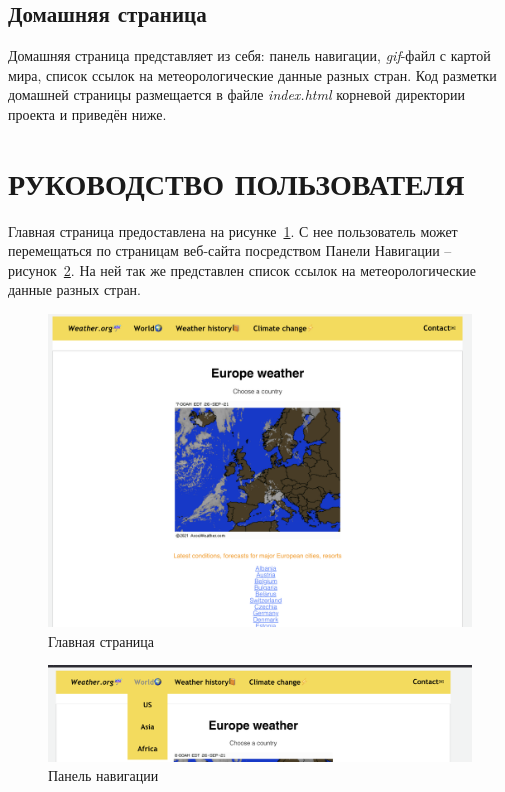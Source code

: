 \documentclass[a4paper,hidelinks,14pt]{extarticle}
\begin{document}
\subsection{Домашняя страница}
Домашняя страница представляет из себя: панель навигации, \textit{gif}-файл с картой мира, список ссылок на метеорологические данные разных стран. Код разметки домашней страницы размещается в файле \textit{index.html} корневой директории проекта и приведён ниже.



\section[Руководство пользователя]{РУКОВОДСТВО ПОЛЬЗОВАТЕЛЯ}

Главная страница предоставлена на рисунке~\ref{fig:fig3}. С нее пользователь может перемещаться по страницам веб-сайта посредством Панели Навигации -- рисунок~\ref{fig:fig4}. На ней так же представлен список ссылок на метеорологические данные разных стран.

\begin{figure}[htbp]
    \centering
    \includegraphics[scale=0.4]{fig/index.png}
    \caption{Главная страница}
    \label{fig:fig3}
\end{figure}

\begin{figure}[htbp]
    \centering
    \includegraphics[scale=0.4]{fig/panel.png}
    \caption{Панель навигации}
    \label{fig:fig4}
\end{figure}
\end{document}
